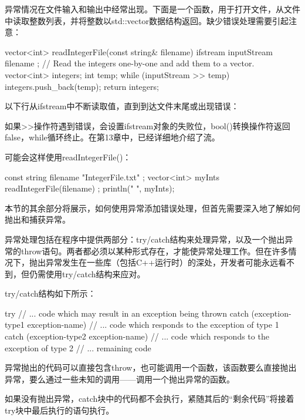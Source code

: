 
异常情况在文件输入和输出中经常出现。下面是一个函数，用于打开文件，从文件中读取整数列表，并将整数以std::vector数据结构返回。缺少错误处理需要引起注意：

\begin{cpp}
vector<int> readIntegerFile(const string& filename)
{
    ifstream inputStream { filename };
    // Read the integers one-by-one and add them to a vector.
    vector<int> integers;
    int temp;
    while (inputStream >> temp) {
        integers.push_back(temp);
    }
    return integers;
}
\end{cpp}

以下行从ifstream中不断读取值，直到到达文件末尾或出现错误：

\begin{cpp}
while (inputStream >> temp) {
\end{cpp}

如果>{}>操作符遇到错误，会设置ifstream对象的失败位，bool()转换操作符返回false，while循环终止。在第13章中，已经详细地介绍了流。

可能会这样使用readIntegerFile()：

\begin{cpp}
const string filename { "IntegerFile.txt" };
vector<int> myInts { readIntegerFile(filename) };
println("{} ", myInts);
\end{cpp}

本节的其余部分将展示，如何使用异常添加错误处理，但首先需要深入地了解如何抛出和捕获异常。


异常处理包括在程序中提供两部分：try/catch结构来处理异常，以及一个抛出异常的throw语句。两者都必须以某种形式存在，才能使异常处理工作。但在许多情况下，抛出异常发生在一些库（包括C++运行时）的深处，开发者可能永远看不到，但仍需使用try/catch结构来应对。

try/catch结构如下所示：

\begin{cpp}
try {
    // ... code which may result in an exception being thrown
} catch (exception-type1 exception-name) {
    // ... code which responds to the exception of type 1
} catch (exception-type2 exception-name) {
    // ... code which responds to the exception of type 2
}
// ... remaining code
\end{cpp}

异常抛出的代码可以直接包含throw，也可能调用一个函数，该函数要么直接抛出异常，要么通过一些未知的调用——调用一个抛出异常的函数。

如果没有抛出异常，catch块中的代码都不会执行，紧随其后的“剩余代码”将接着try块中最后执行的语句执行。

